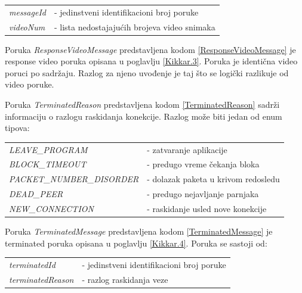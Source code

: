 \documentclass[12pt,oneside]{memoir}
\begin{document}
\begin{center}
\begin{tabular}{ p{4cm} p{10cm} }
 \textit{messageId} & - jedinstveni identifikacioni broj poruke \\ 
 \textit{videoNum} & - lista nedostajajućih brojeva video snimaka \\ 
\end{tabular}
\end{center}




Poruka \textit{ResponseVideoMessage} predstavljena kodom \ref{ResponseVideoMessage} je response video poruka opisana u poglavlju \ref{Kikkar.3}. Poruka je identična video poruci po sadržaju. Razlog za njeno uvođenje je taj što se logički razlikuje od video poruke.




Poruka \textit{TerminatedReason} predstavljena kodom \ref{TerminatedReason} sadrži informaciju o razlogu raskidanja konekcije. Razlog može biti jedan od enum tipova:
 
\begin{center}
\begin{tabular}{ p{6.4cm} p{7.6cm} }
 \textit{LEAVE\_PROGRAM} & - zatvaranje aplikacije \\ 
 \textit{BLOCK\_TIMEOUT} & - predugo vreme čekanja bloka \\ 
 \textit{PACKET\_NUMBER\_DISORDER} & - dolazak paketa u krivom redosledu \\ 
 \textit{DEAD\_PEER} & - predugo nejavljanje parnjaka \\ 
 \textit{NEW\_CONNECTION} & - raskidanje usled nove konekcije \\  
\end{tabular}
\end{center}




Poruka \textit{TerminatedMessage} predstavljena kodom \ref{TerminatedMessage} je terminated poruka opisana u poglavlju \ref{Kikkar.4}. Poruka se sastoji od:
 
\begin{center}
\begin{tabular}{ p{4cm} p{10cm} }
 \textit{terminatedId} & - jedinstveni identifikacioni broj poruke \\ 
 \textit{terminatedReason} & - razlog raskidanja veze \\ 
\end{tabular}
\end{center}
\end{document}
